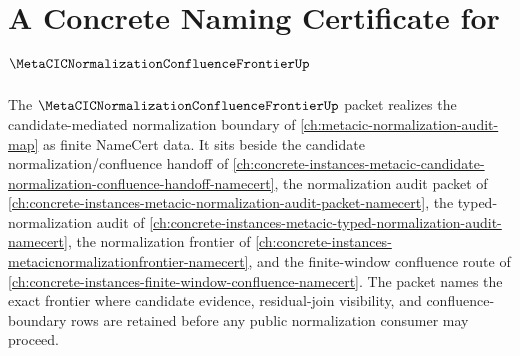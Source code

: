 \chapter{A Concrete Naming Certificate for $\MetaCICNormalizationConfluenceFrontierUp$}
\label{ch:concrete-instances-metacic-normalization-confluence-frontier-namecert}

The $\MetaCICNormalizationConfluenceFrontierUp$ packet realizes the candidate-mediated normalization boundary of \autoref{ch:metacic-normalization-audit-map} as finite NameCert data. It sits beside the candidate normalization/confluence handoff of \autoref{ch:concrete-instances-metacic-candidate-normalization-confluence-handoff-namecert}, the normalization audit packet of \autoref{ch:concrete-instances-metacic-normalization-audit-packet-namecert}, the typed-normalization audit of \autoref{ch:concrete-instances-metacic-typed-normalization-audit-namecert}, the normalization frontier of \autoref{ch:concrete-instances-metacicnormalizationfrontier-namecert}, and the finite-window confluence route of \autoref{ch:concrete-instances-finite-window-confluence-namecert}. The packet names the exact frontier where candidate evidence, residual-join visibility, and confluence-boundary rows are retained before any public normalization consumer may proceed.

